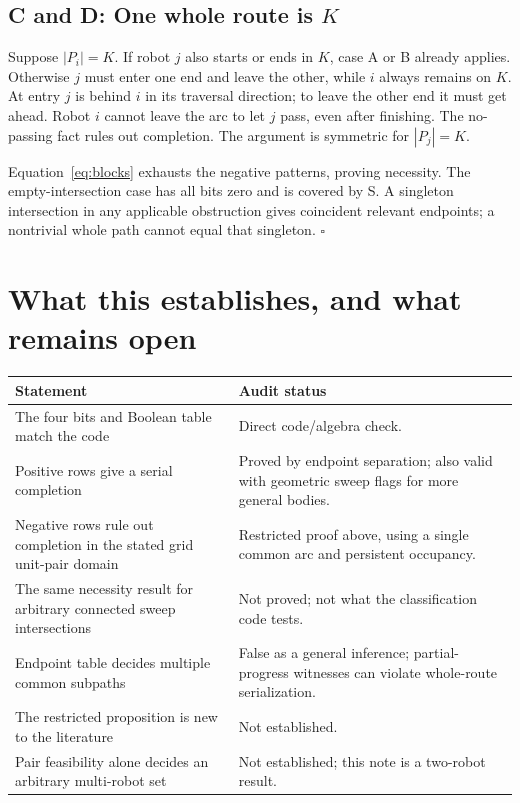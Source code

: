 \documentclass[11pt,a4paper]{article}
\begin{document}
\subsection*{C and D: One whole route is $K$}
Suppose $|P_i|=K$. If robot $j$ also starts or ends in $K$, case A or B
already applies. Otherwise $j$ must enter one end and leave the other, while
$i$ always remains on $K$. At entry $j$ is behind $i$ in its traversal
direction; to leave the other end it must get ahead. Robot $i$ cannot leave
the arc to let $j$ pass, even after finishing. The no-passing fact rules out
completion. The argument is symmetric for $|P_j|=K$.

Equation~\eqref{eq:blocks} exhausts the negative patterns, proving necessity.
The empty-intersection case has all bits zero and is covered by S. A singleton
intersection in any applicable obstruction gives coincident relevant endpoints;
a nontrivial whole path cannot equal that singleton. $\square$

\clearpage
\small
\section{What this establishes, and what remains open}
\begin{center}\small
\begin{tabular}{p{73mm}p{68mm}}\toprule
Statement & Audit status\\\midrule
The four bits and Boolean table match the code & Direct code/algebra check.\\
Positive rows give a serial completion & Proved by endpoint separation; also
valid with geometric sweep flags for more general bodies.\\
Negative rows rule out completion in the stated grid unit-pair domain &
Restricted proof above, using a single common arc and persistent occupancy.\\
The same necessity result for arbitrary connected sweep intersections &
Not proved; not what the classification code tests.\\
Endpoint table decides multiple common subpaths & False as a general inference;
partial-progress witnesses can violate whole-route serialization.\\
The restricted proposition is new to the literature & Not established.\\
Pair feasibility alone decides an arbitrary multi-robot set & Not established;
this note is a two-robot result.\\\bottomrule
\end{tabular}
\end{center}
\end{document}
